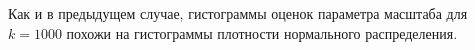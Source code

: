 \documentclass[14pt, a4paper, russian]{report}
\begin{document}


Как и в предыдущем случае, гистограммы оценок параметра масштаба для $k = 1000$ похожи на гистограммы плотности нормального распределения.

\newpage

%
%  
%  
%
\end{document}
